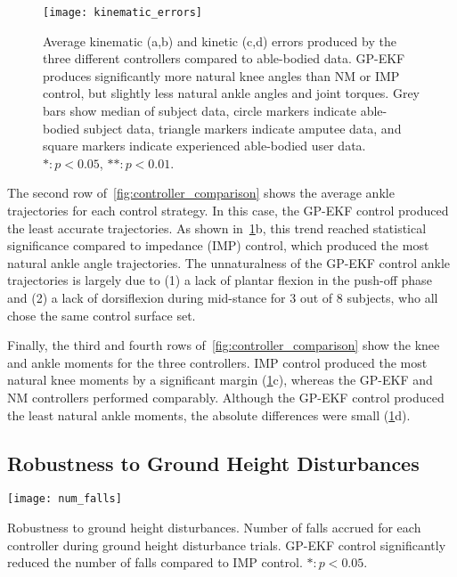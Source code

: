 \begin{figure}[t]
   \centering \texttt{[image: kinematic\_errors]}
   \caption[Average kinematic and kinetic errors]{Average kinematic (a,b) and
   kinetic (c,d) errors produced by the three different controllers compared to
   able-bodied data. GP-EKF produces significantly more natural knee angles than
   NM or IMP control, but slightly less natural ankle angles and joint torques.
   Grey bars show median of subject data, circle markers indicate able-bodied
   subject data, triangle markers indicate amputee data, and square markers
   indicate experienced able-bodied user data. $*: p < 0.05$, $**: p <
   0.01$.}\label{fig:kinematic_errors}
\end{figure}
The second row of~\cref{fig:controller_comparison} shows the average ankle
trajectories for each control strategy. In this case, the GP-EKF control
produced the least accurate trajectories. As shown
in~\cref{fig:kinematic_errors}b, this trend reached statistical significance
compared to impedance (IMP) control, which produced the most natural ankle angle
trajectories. The unnaturalness of the GP-EKF control ankle trajectories is
largely due to (1) a lack of plantar flexion in the push-off phase and (2) a
lack of dorsiflexion during mid-stance for 3 out of 8 subjects, who all chose
the same control surface set.

Finally, the third and fourth rows of~\cref{fig:controller_comparison} show the
knee and ankle moments for the three controllers. IMP control produced the most
natural knee moments by a significant margin (\cref{fig:kinematic_errors}c),
whereas the GP-EKF and NM controllers performed comparably. Although the GP-EKF
control produced the least natural ankle moments, the absolute differences were
small (\cref{fig:kinematic_errors}d).

\subsection{Robustness to Ground Height Disturbances}
\begin{marginfigure}
    \centering
    \texttt{[image: num\_falls]} 
    \caption[Robustness to ground height disturbances]{Robustness to ground
    height disturbances. Number of falls accrued for each controller during
    ground height disturbance trials. GP-EKF control significantly reduced the
    number of falls compared to IMP control. $*: p <
    0.05$.}\label{fig:num_block_falls}
\end{marginfigure}

